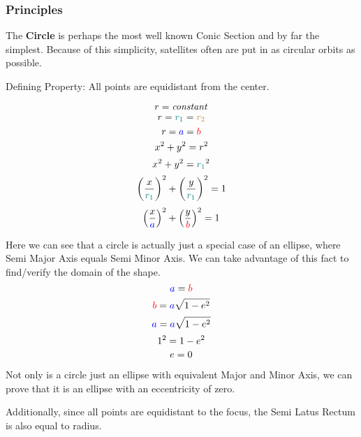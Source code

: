 \subsubsection{Principles}
The \textbf{Circle} is perhaps the most well known Conic Section and by far the simplest. Because of this simplicity, satellites often are put in as circular orbits as possible.
\begin{center}
\end{center}

Defining Property: All points are equidistant from the center.

\begin{multicols}{2}
\noindent
 $$r = \text{\textit{constant}}$$
 $$r = \textcolor{teal}{r_1} = \textcolor{brown}{r_2}$$
 $$r = \textcolor{blue}{a} = \textcolor{red}{b}$$
 $$x^2 + y^2 = \textcolor{black}{r}^2$$
 $$x^2 + y^2 = \textcolor{teal}{r_1}^2$$
 $$\left(\frac{x}{\textcolor{teal}{r_1}}\right)^2 + 
 \left(\frac{y}{\textcolor{teal}{r_1}}\right)^2 = 1$$
 $$\left(\frac{x}{\textcolor{blue}{a}}\right)^2 + \left(\frac{y}{\textcolor{red}{b}}\right)^2 = 1$$
 \end{multicols}
 
 Here we can see that a circle is actually just a special case of an ellipse, where Semi Major Axis equals Semi Minor Axis. We can take advantage of this fact to find/verify the domain of the shape.
 $$\textcolor{blue}{a} = \textcolor{red}{b}$$
 $$\textcolor{red}{b} = \textcolor{blue}{a}\sqrt{1-\textcolor{black}{e}^2}$$
 $$\textcolor{blue}{a} = \textcolor{blue}{a}\sqrt{1-\textcolor{black}{e}^2}$$
 $$1^2 = 1-\textcolor{black}{e}^2$$
 $$\textcolor{black}{e} = 0$$
 
 Not only is a circle just an ellipse with equivalent Major and Minor Axis, we can prove that it is an ellipse with an eccentricity of zero.
 
 Additionally, since all points are equidistant to the focus, the Semi Latus Rectum is also equal to radius.
